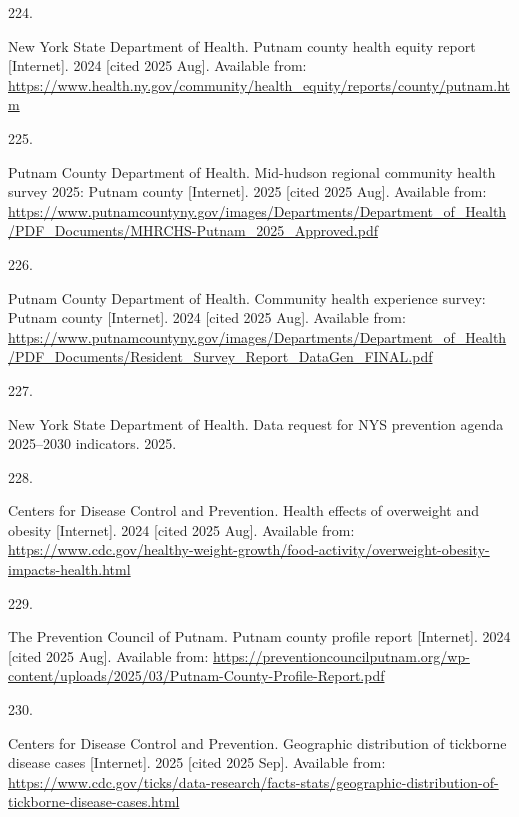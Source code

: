 \documentclass[
  english,
  letterpaper,
]{report}
\newlength{\cslhangindent}
\newlength{\csllabelwidth}
\newenvironment{CSLReferences}[2] %
 {\begin{list}{}{%
  \setlength{\itemindent}{0pt}
  \setlength{\leftmargin}{0pt}
  \setlength{\parsep}{0pt}
  \ifodd #1
   \setlength{\leftmargin}{\cslhangindent}
   \setlength{\itemindent}{-1\cslhangindent}
  \fi
  \setlength{\itemsep}{#2\baselineskip}}}
 {\end{list}}
\newcommand{\CSLLeftMargin}[1]{\parbox[t]{\csllabelwidth}{\strut#1\strut}}
\newcommand{\CSLRightInline}[1]{\parbox[t]{\linewidth - \csllabelwidth}{\strut#1\strut}}
\begin{document}
\begin{CSLReferences}{0}{1}
\CSLLeftMargin{224. }%
\CSLRightInline{New York State Department of Health. Putnam county
health equity report {[}Internet{]}. 2024 {[}cited 2025 Aug{]}.
Available from:
\url{https://www.health.ny.gov/community/health_equity/reports/county/putnam.htm}}

\CSLLeftMargin{225. }%
\CSLRightInline{Putnam County Department of Health. Mid-hudson regional
community health survey 2025: Putnam county {[}Internet{]}. 2025
{[}cited 2025 Aug{]}. Available from:
\url{https://www.putnamcountyny.gov/images/Departments/Department_of_Health/PDF_Documents/MHRCHS-Putnam_2025_Approved.pdf}}

\CSLLeftMargin{226. }%
\CSLRightInline{Putnam County Department of Health. Community health
experience survey: Putnam county {[}Internet{]}. 2024 {[}cited 2025
Aug{]}. Available from:
\url{https://www.putnamcountyny.gov/images/Departments/Department_of_Health/PDF_Documents/Resident_Survey_Report_DataGen_FINAL.pdf}}

\CSLLeftMargin{227. }%
\CSLRightInline{New York State Department of Health. Data request for
NYS prevention agenda 2025--2030 indicators. 2025.}

\CSLLeftMargin{228. }%
\CSLRightInline{Centers for Disease Control and Prevention. Health
effects of overweight and obesity {[}Internet{]}. 2024 {[}cited 2025
Aug{]}. Available from:
\url{https://www.cdc.gov/healthy-weight-growth/food-activity/overweight-obesity-impacts-health.html}}

\CSLLeftMargin{229. }%
\CSLRightInline{The Prevention Council of Putnam. Putnam county profile
report {[}Internet{]}. 2024 {[}cited 2025 Aug{]}. Available from:
\url{https://preventioncouncilputnam.org/wp-content/uploads/2025/03/Putnam-County-Profile-Report.pdf}}

\CSLLeftMargin{230. }%
\CSLRightInline{Centers for Disease Control and Prevention. Geographic
distribution of tickborne disease cases {[}Internet{]}. 2025 {[}cited
2025 Sep{]}. Available from:
\url{https://www.cdc.gov/ticks/data-research/facts-stats/geographic-distribution-of-tickborne-disease-cases.html}}


\end{CSLReferences}
\end{document}
